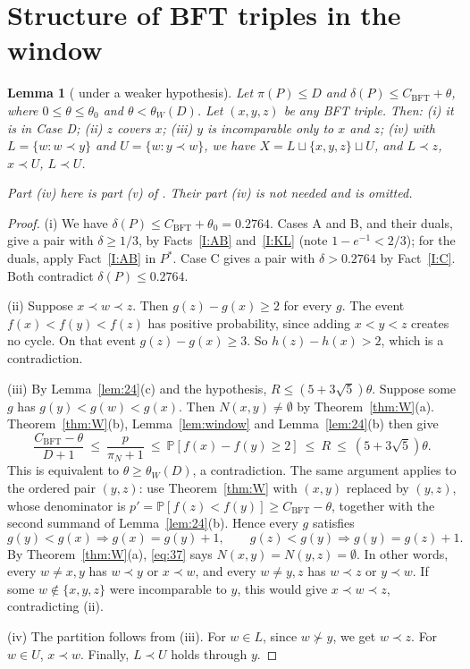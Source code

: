\documentclass[10pt]{amsart}
\newtheorem{lemma}[theorem]{Lemma}
\theoremstyle{definition}
\theoremstyle{remark}
\newcommand{\PP}{\mathbb{P}}
\newcommand{\CB}{C_{\mathrm{BFT}}}
\newcommand{\tW}{\theta_W}
\begin{document}
\section{Structure of BFT triples in the window}

\begin{lemma}[{\cite[Lemma~3.2]{KSBFT}} under a weaker hypothesis]\label{lem:struct}
Let $\pi(P)\le D$ and $\delta(P)\le\CB+\theta$, where $0\le\theta\le\theta_0$ and $\theta<\tW(D)$. Let $(x,y,z)$ be any BFT triple. Then:
(i) it is in Case D;
(ii) $z$ covers $x$;
(iii) $y$ is incomparable only to $x$ and $z$;
(iv) with $L=\{w:w\prec y\}$ and $U=\{w:y\prec w\}$, we have $X=L\sqcup\{x,y,z\}\sqcup U$, and $L\prec z$, $x\prec U$, $L\prec U$.

Part (iv) here is part (v) of \cite[Lemma~3.2]{KSBFT}. Their part (iv) is not needed and is omitted.
\end{lemma}
\begin{proof}
(i) We have $\delta(P)\le\CB+\theta_0=0.2764$.
Cases A and B, and their duals, give a pair with $\delta\ge 1/3$, by Facts~\ref{I:AB} and~\ref{I:KL} (note $1-e^{-1}<2/3$); for the duals, apply Fact~\ref{I:AB} in $P^*$.
Case C gives a pair with $\delta>0.2764$ by Fact~\ref{I:C}.
Both contradict $\delta(P)\le 0.2764$.

(ii) Suppose $x\prec w\prec z$. Then $g(z)-g(x)\ge2$ for every $g$.
The event $f(x)<f(y)<f(z)$ has positive probability, since adding $x<y<z$ creates no cycle. On that event $g(z)-g(x)\ge3$.
So $h(z)-h(x)>2$, which is a contradiction.

(iii) By Lemma~\ref{lem:24}(c) and the hypothesis, $R\le(5+3\sqrt5)\theta$.
Suppose some $g$ has $g(y)<g(w)<g(x)$. Then $N(x,y)\ne\emptyset$ by Theorem~\ref{thm:W}(a).
Theorem~\ref{thm:W}(b), Lemma~\ref{lem:window} and Lemma~\ref{lem:24}(b) then give
\[
\frac{\CB-\theta}{D+1}\ \le\ \frac{p}{\pi_N+1}\ \le\ \PP[f(x)-f(y)\ge2]\ \le\ R\ \le\ (5+3\sqrt5)\theta .
\]
This is equivalent to $\theta\ge\tW(D)$, a contradiction.
The same argument applies to the ordered pair $(y,z)$: use Theorem~\ref{thm:W} with $(x,y)$ replaced by $(y,z)$, whose denominator is $p'=\PP[f(z)<f(y)]\ge\CB-\theta$, together with the second summand of Lemma~\ref{lem:24}(b).
Hence every $g$ satisfies
\begin{equation}\label{eq:37}
g(y)<g(x)\Rightarrow g(x)=g(y)+1,\qquad g(z)<g(y)\Rightarrow g(y)=g(z)+1 .
\end{equation}
By Theorem~\ref{thm:W}(a), \eqref{eq:37} says $N(x,y)=N(y,z)=\emptyset$. In other words, every $w\ne x,y$ has $w\prec y$ or $x\prec w$, and every $w\ne y,z$ has $w\prec z$ or $y\prec w$.
If some $w\notin\{x,y,z\}$ were incomparable to $y$, this would give $x\prec w\prec z$, contradicting (ii).

(iv) The partition follows from (iii). For $w\in L$, since $w\not\succ y$, we get $w\prec z$. For $w\in U$, $x\prec w$. Finally, $L\prec U$ holds through $y$.
\end{proof}
\end{document}

